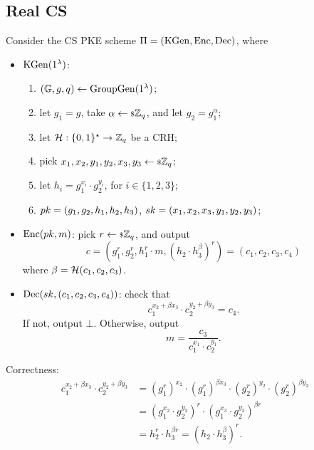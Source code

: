 \subsection{Real \acl{CS}}

\begin{construction}[\acl{CS}] \label{cons:cs}
	Consider the \ac{CS} \ac{PKE} scheme $\Pi = (\mathrm{KGen}, \mathrm{Enc}, \mathrm{Dec})$, where
	\begin{itemize}
		\item $\mathrm{KGen}(1^{\lambda})$:
			\begin{enumerate}
				\item $(\mathbb{G} , \allowbreak g , \allowbreak q) \leftarrow \mathrm{GroupGen}(1^{\lambda})$;
				\item let $g_1 = g$, take $\alpha \leftarrow {\scriptstyle \$} {\mathbb{Z}_q}$, and let $g_2 = g_1^{\alpha}$;
				\item let $\mathcal{H} : \{0,1\}^{\star} \to \mathbb{Z}_q$ be a \ac{CRH};
				\item pick $x_1, x_2, y_1, y_2, x_3, y_3 \leftarrow {\scriptstyle \$} {\mathbb{Z}_q}$;
				\item let $h_i = g_1^{x_i} \cdot g_2^{y_i}$, for $i \in \{1,2,3\}$;
				\item $pk = (g_1, g_2, h_1, h_2, h_3)$, $sk = (x_1, x_2, x_3, y_1, y_2, y_3)$;
			\end{enumerate}
		\item $\mathrm{Enc}(pk, m)$:
			pick $r \leftarrow {\scriptstyle \$} {\mathbb{Z}_q}$, and output
			\begin{equation*}
				c = \left( g_1^{r}, g_2^{r}, h_1^{r} \cdot m, \left(h_2 \cdot h_3^{\beta}\right)^{r} \right) = (c_1, c_2, c_3, c_4)
			\end{equation*}
			where $\beta = \mathcal{H}(c_1, c_2, c_3)$.
		\item $\mathrm{Dec}(sk, (c_1, c_2, c_3, c_4))$:
			check that
			\begin{equation*}
				c_1^{x_2 + \beta x_3} \cdot c_2^{y_2 + \beta y_3} = c_4.
			\end{equation*}
			If not, output $\bot$.
			Otherwise, output
			\begin{equation*}
				m = \frac{c_3}{c_1^{x_1} \cdot c_2^{y_1}}.
			\end{equation*}
	\end{itemize}
	Correctness:
	\begin{align*}
		c_1^{x_2 + \beta x_3} \cdot c_2^{y_2 + \beta y_3}
		& =
		\left( g_1^r \right)^{x_2} \cdot
		\left( g_1^r \right)^{\beta x_3} \cdot
		\left( g_2^r \right)^{y_2} \cdot
		\left( g_2^r \right)^{\beta y_3} \\
		& = 
		\left( g_1^{x_2} \cdot g_2^{y_2} \right)^{r} \cdot
		\left( g_1^{x_3} \cdot g_2^{y_3} \right)^{\beta r} \\
		& = h_2^{r} \cdot h_3^{\beta r}
		=
		\left( h_2 \cdot h_3^{\beta} \right)^{r}.
	\end{align*}
\end{construction}

